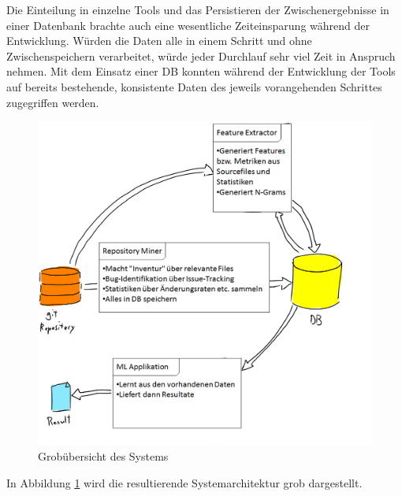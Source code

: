 \documentclass[10pt, a4paper]{article}
\begin{document}
Die Einteilung in einzelne Tools und das Persistieren der Zwischenergebnisse in einer Datenbank brachte auch eine wesentliche Zeiteinsparung während der Entwicklung. Würden die Daten alle in einem Schritt und ohne Zwischenspeichern verarbeitet, würde jeder Durchlauf sehr viel Zeit in Anspruch nehmen. Mit dem Einsatz einer \ac{DB} konnten während der Entwicklung der Tools auf bereits bestehende, konsistente Daten des jeweils vorangehenden Schrittes zugegriffen werden.

\begin{figure}[!ht]
	\centering
	\includegraphics[width=1\textwidth]{resources/images/system_design.png}
	\caption{Grobübersicht des Systems}
	\label{systemdesign}
\end{figure}

In Abbildung \ref{systemdesign} wird die resultierende Systemarchitektur grob dargestellt.

\end{document}
